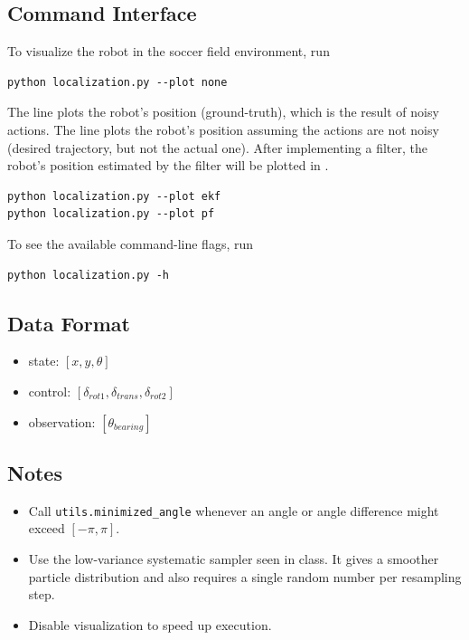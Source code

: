 \documentclass[tp]{lcc}
\begin{document}
\subsection{Command Interface}

To visualize the robot in the soccer field environment, run

\begin{lstlisting}[style=bash]
python localization.py --plot none
\end{lstlisting}

The {\color{blue}} line plots the robot's position (ground-truth), which is the result of noisy actions. The {\color{green}} line plots the robot's position assuming the actions are not noisy (desired trajectory, but not the actual one). After implementing a filter, the robot's position estimated by the filter will be plotted in {\color{red}}.

\begin{lstlisting}[style=bash]
python localization.py --plot ekf
python localization.py --plot pf
\end{lstlisting}

To see the available command-line flags, run

\begin{lstlisting}[style=bash]
python localization.py -h
\end{lstlisting}

\subsection{Data Format}

\begin{itemize}
\item state: $[x,y,\theta]$
\item control: $[\delta_{rot1},\delta_{trans},\delta_{rot2}]$
\item observation: $[\theta_{bearing}]$
\end{itemize}

\subsection{Notes}
\begin{itemize}
\item Call \lstinline[style=bash]{utils.minimized_angle} whenever an angle or angle difference might exceed $[-\pi, \pi]$.
\item Use the low-variance systematic sampler seen in class. It gives a smoother particle distribution and also requires a single random number per resampling step.
\item Disable visualization to speed up execution.
\end{itemize}
\end{document}
